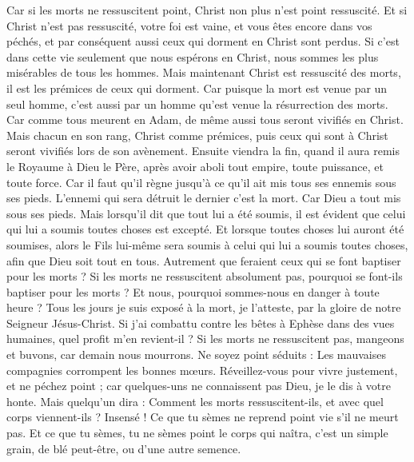 \begin{multicols}{2}
Car si les morts ne ressuscitent point, Christ non plus n'est point ressuscité.
Et si Christ n'est pas ressuscité, votre foi est vaine, et vous êtes encore dans vos péchés,
et par conséquent aussi ceux qui dorment en Christ sont perdus.
Si c’est dans cette vie seulement que nous espérons en Christ, nous sommes les plus misérables de tous les hommes.
Mais maintenant Christ est ressuscité des morts, il est les prémices de ceux qui dorment.
Car puisque la mort est venue par un seul homme, c’est aussi par un homme qu’est venue la résurrection des morts.
Car comme tous meurent en Adam, de même aussi tous seront vivifiés en Christ.
Mais chacun en son rang, Christ comme prémices, puis ceux qui sont à Christ seront vivifiés lors de son avènement.
Ensuite viendra la fin, quand il aura remis le Royaume à Dieu le Père, après avoir aboli tout empire, toute puissance, et toute force.
Car il faut qu'il règne jusqu'à ce qu'il ait mis tous ses ennemis sous ses pieds.
L'ennemi qui sera détruit le dernier c'est la mort.
Car Dieu a tout mis sous ses pieds. Mais lorsqu’il dit que tout lui a été soumis, il est évident que celui qui lui a soumis toutes choses est excepté.
Et lorsque toutes choses lui auront été soumises, alors le Fils lui-même sera soumis à celui qui lui a soumis toutes choses, afin que Dieu soit tout en tous.
Autrement que feraient ceux qui se font baptiser pour les morts ? Si les morts ne ressuscitent absolument pas, pourquoi se font-ils baptiser pour les morts ?
Et nous, pourquoi sommes-nous en danger à toute heure ?
Tous les jours je suis exposé à la mort, je l’atteste, par la gloire de notre Seigneur Jésus-Christ.
Si j'ai combattu contre les bêtes à Ephèse dans des vues humaines, quel profit m’en revient-il ? Si les morts ne ressuscitent pas, mangeons et buvons, car demain nous mourrons.
Ne soyez point séduits : Les mauvaises compagnies corrompent les bonnes mœurs.
Réveillez-vous pour vivre justement, et ne péchez point ; car quelques-uns ne connaissent pas Dieu, je le dis à votre honte.
Mais quelqu'un dira : Comment les morts ressuscitent-ils, et avec quel corps viennent-ils ?
Insensé ! Ce que tu sèmes ne reprend point vie s'il ne meurt pas.
Et ce que tu sèmes, tu ne sèmes point le corps qui naîtra, c’est un simple grain, de blé peut-être, ou d’une autre semence.

\end{multicols}
